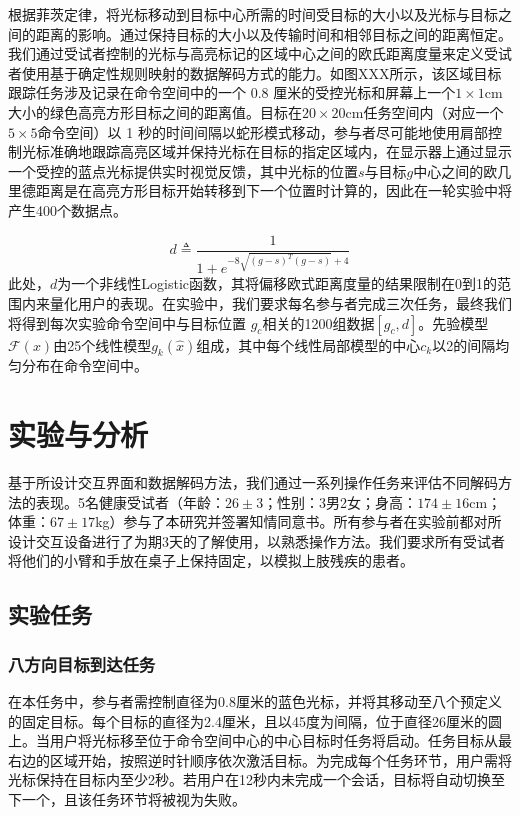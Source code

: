 根据菲茨定律\cite{pittsINFORMATIONCAPACITYHUMANa}，将光标移动到目标中心所需的时间受目标的大小以及光标与目标之间的距离的影响。通过保持目标的大小以及传输时间和相邻目标之间的距离恒定。我们通过受试者控制的光标与高亮标记的区域中心之间的欧氏距离度量来定义受试者使用基于确定性规则映射的数据解码方式的能力。如图XXX所示，该区域目标跟踪任务涉及记录在命令空间中的一个 0.8 厘米的受控光标和屏幕上一个$1\times1$cm大小的绿色高亮方形目标之间的距离值。目标在$20\times20$cm任务空间内（对应一个$5\times5$命令空间）以 1 秒的时间间隔以蛇形模式移动，参与者尽可能地使用肩部控制光标准确地跟踪高亮区域并保持光标在目标的指定区域内，在显示器上通过显示一个受控的蓝点光标提供实时视觉反馈，其中光标的位置$s$与目标$g$中心之间的欧几里德距离是在高亮方形目标开始转移到下一个位置时计算的，因此在一轮实验中将产生400个数据点。

\begin{equation}
    \label{ex12}
    d \triangleq \frac{1}{1+e^{-8\sqrt{(g-s)^T(g-s)}+4}} 
\end{equation}    
此处，$d$为一个非线性Logistic函数，其将偏移欧式距离度量的结果限制在0到1的范围内来量化用户的表现。在实验中，我们要求每名参与者完成三次任务，最终我们将得到每次实验命令空间中与目标位置   $g_c$相关的1200组数据$[g_c,d]$。先验模型$\mathcal{F}(x)$由25个线性模型$g_k(\hat x)$组成，其中每个线性局部模型的中心$c_k$以2的间隔均匀分布在命令空间中。

\section{实验与分析}基于所设计交互界面和数据解码方法，我们通过一系列操作任务来评估不同解码方法的表现。5名健康受试者（年龄：$26\pm3$；性别：3男2女；身高：$174\pm16$cm；体重：$67\pm17$kg）参与了本研究并签署知情同意书。所有参与者在实验前都对所设计交互设备进行了为期3天的了解使用，以熟悉操作方法。我们要求所有受试者将他们的小臂和手放在桌子上保持固定，以模拟上肢残疾的患者。

\subsection{实验任务}   
    \subsubsection{八方向目标到达任务}在本任务中，参与者需控制直径为0.8厘米的蓝色光标，并将其移动至八个预定义的固定目标。每个目标的直径为2.4厘米，且以45度为间隔，位于直径26厘米的圆上。当用户将光标移至位于命令空间中心的中心目标时任务将启动。任务目标从最右边的区域开始，按照逆时针顺序依次激活目标。为完成每个任务环节，用户需将光标保持在目标内至少2秒。若用户在12秒内未完成一个会话，目标将自动切换至下一个，且该任务环节将被视为失败。

